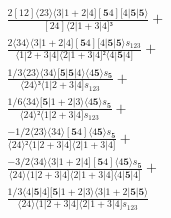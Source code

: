 \documentclass[varwidth, border=5pt]{standalone}
\begin{document}
\begin{my}
$\begin{gathered}
\scriptscriptstyle\frac{2[12]⟨23⟩⟨3|1+2|4][𝟓4][4|𝟓|𝟓⟩}{[24]⟨2|1+3|4]³} +\\
\scriptscriptstyle\frac{2⟨34⟩⟨3|1+2|4][𝟓4][4|𝟓|𝟓⟩s_{123}}{⟨1|2+3|4]⟨2|1+3|4]²⟨4|𝟓|4]} +\\
\scriptscriptstyle\frac{1/3⟨23⟩⟨34⟩[𝟓|𝟓|4⟩⟨4𝟓⟩s_{𝟓}}{⟨24⟩³⟨1|2+3|4]s_{123}} +\\
\scriptscriptstyle\frac{1/6⟨34⟩[𝟓|1+2|3⟩⟨4𝟓⟩s_{𝟓}}{⟨24⟩²⟨1|2+3|4]s_{123}} +\\
\scriptscriptstyle\frac{-1/2⟨23⟩⟨34⟩[𝟓4]⟨4𝟓⟩s_{𝟓}}{⟨24⟩²⟨1|2+3|4]⟨2|1+3|4]} +\\
\scriptscriptstyle\frac{-3/2⟨34⟩⟨3|1+2|4][𝟓4]⟨4𝟓⟩s_{𝟓}}{⟨24⟩⟨1|2+3|4]⟨2|1+3|4]⟨4|𝟓|4]} +\\
\scriptscriptstyle\frac{1/3⟨4|𝟓|4][𝟓|1+2|3⟩⟨3|1+2|𝟓|𝟓⟩}{⟨24⟩⟨1|2+3|4]⟨2|1+3|4]s_{123}} \phantom{+}
\end{gathered}$
\end{my}
\end{document}
